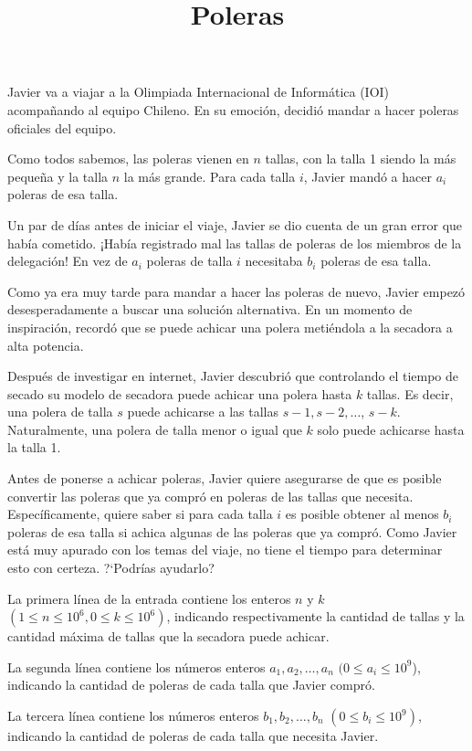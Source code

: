 \documentclass{oci}
\title{Poleras}
\begin{document}
\begin{problemDescription}
Javier va a viajar a la Olimpiada Internacional de Informática (IOI)
acompañando al equipo Chileno.
En su emoción, decidió mandar a hacer poleras oficiales del equipo.

Como todos sabemos, las poleras vienen en $n$ tallas, con la talla 1 siendo la más pequeña
y la talla $n$ la más grande.
Para cada talla $i$, Javier mandó a hacer $a_i$ poleras de esa talla.

Un par de días antes de iniciar el viaje, Javier se dio
cuenta de un gran error que había cometido.
¡Había registrado mal las tallas de poleras de los miembros de la delegación!
En vez de $a_i$ poleras de talla $i$ necesitaba $b_i$ poleras de esa talla.

Como ya era muy tarde para mandar a hacer las poleras de nuevo, Javier
empezó desesperadamente a buscar una solución alternativa.
En un momento de inspiración, recordó que se puede achicar una polera metiéndola a
la secadora a alta potencia.

Después de investigar en internet, Javier descubrió que controlando el tiempo de secado su
modelo de secadora puede achicar una polera hasta $k$ tallas.
Es decir, una polera de talla $s$ puede achicarse a las tallas $s-1, s-2, \dots$, $s-k$.
Naturalmente, una polera de talla menor o igual que $k$ solo puede achicarse hasta la talla 1.

Antes de ponerse a achicar poleras, Javier quiere asegurarse de que es
posible convertir las poleras que ya compró en poleras de
las tallas que necesita.
Específicamente, quiere saber si para cada talla $i$ es posible obtener
al menos $b_i$ poleras de esa talla si achica algunas de las poleras que ya compró.
Como Javier está muy apurado con los temas del viaje, no tiene el tiempo para determinar
esto con certeza.
?`Podrías ayudarlo?
\end{problemDescription}

\begin{inputDescription}
La primera línea de la entrada contiene los enteros $n$ y $k$ $(1 \leq n \leq 10^6, 0 \leq k \leq 10^6)$,
indicando respectivamente la cantidad de tallas y la cantidad máxima de tallas que la secadora puede achicar.

La segunda línea contiene los números enteros $a_1, a_2, \dots, a_n$ $(0 \leq a_i \leq 10^9$),
indicando la cantidad de poleras de cada talla que Javier compró.

La tercera línea contiene los números enteros $b_1, b_2, \dots, b_n$ $(0 \leq b_i \leq 10^9)$, indicando
la cantidad de poleras de cada talla que necesita Javier.
\end{inputDescription}
\end{document}

